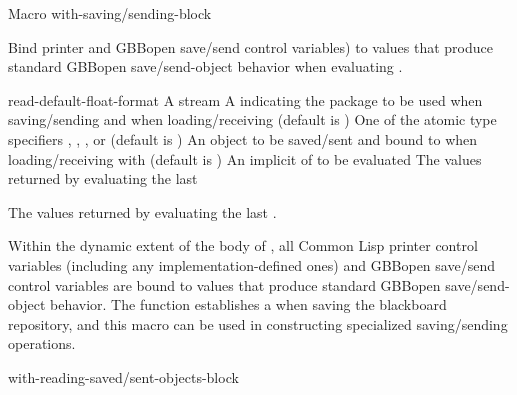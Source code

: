 \documentclass[10pt,twoside,english,pdftex]{article}
\begin{document}
\begin{functiondoc}{Macro}%
  {with-saving/sending-block}%
  {\code{(} 
     \code{)}
    \superstar
    \returns{} \superstar}
  
\fnsyntax

\fnpurpose Bind printer and GBBopen save/send control variables) to
values that produce standard GBBopen save/send-object behavior when
evaluating .

\fnpackage {}

\fnmodule {}

\fnargs
\begin{args}{read-default-float-format}
\arg[stream] A stream
\arg[package] A  indicating the package to
be used when saving/sending and when loading/receiving (default is
)
 One of the atomic type specifiers
, ,
, or  (default is
)
\arg[value] An object to be saved/sent and bound to
 when loading/receiving with
 (default is \nil)
\arg[forms] An implicit  of  to be evaluated
\arg[results] The values returned by evaluating the last 
\end{args}

\fnreturns The values returned by evaluating the last .

\fndescription Within the dynamic extent of the body of ,
all Common Lisp printer control variables (including any
implementation-defined ones) and GBBopen save/send control variables are bound
to values that produce standard GBBopen save/send-object behavior.  The
function  establishes a
 when saving the blackboard
repository, and this macro can be used in constructing specialized
saving/sending operations.

\begin{alsos}{with-reading-saved/sent-objects-block}
\end{alsos}

\end{functiondoc}
\end{document}
